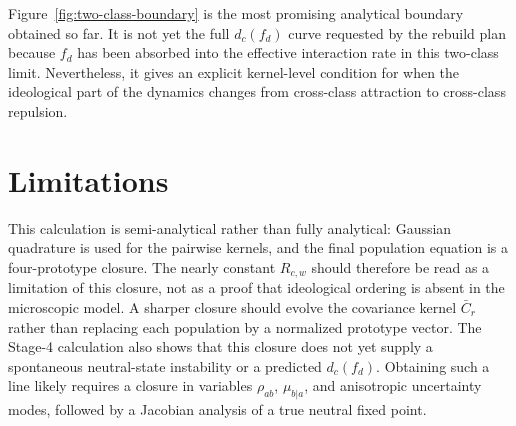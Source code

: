 \documentclass{article}
\newcommand{\Rcw}{R_{c,w}}
\begin{document}
Figure~\ref{fig:two-class-boundary} is the most promising analytical boundary
obtained so far.  It is not yet the full \(d_c(f_d)\) curve requested by the
rebuild plan because \(f_d\) has been absorbed into the effective interaction
rate in this two-class limit.  Nevertheless, it gives an explicit kernel-level
condition for when the ideological part of the dynamics changes from
cross-class attraction to cross-class repulsion.

\section{Limitations}

This calculation is semi-analytical rather than fully analytical: Gaussian
quadrature is used for the pairwise kernels, and the final population equation is
a four-prototype closure.  The nearly constant \(\Rcw\) should therefore be read
as a limitation of this closure, not as a proof that ideological ordering is
absent in the microscopic model.  A sharper closure should evolve the covariance
kernel \(\bar C_r\) rather than replacing each population by a normalized
prototype vector.  The Stage-4 calculation also shows that this closure does not
yet supply a spontaneous neutral-state instability or a predicted
\(d_c(f_d)\).  Obtaining such a line likely requires a closure in variables
\(\rho_{ab}\), \(\mu_{b|a}\), and anisotropic uncertainty modes, followed by a
Jacobian analysis of a true neutral fixed point.
\end{document}

